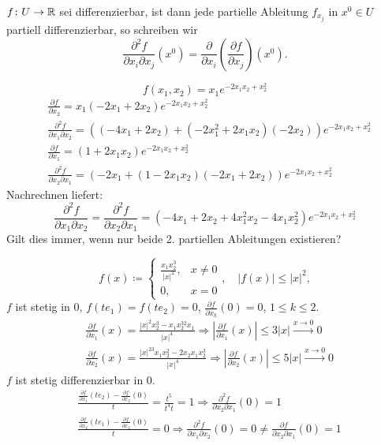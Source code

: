 \newpage
\begin{definition}
	$ f\colon U\rightarrow\mathbb{R} $ sei differenzierbar, ist dann jede partielle Ableitung $ f_{x_j} $ in $ x^0\in U $ partiell differenzierbar, so schreiben wir
	\[ \frac{\partial^2 f}{\partial x_i\partial x_j}(x^0)=\frac{\partial}{\partial x_i}\left(\frac{\partial f}{\partial x_j}\right)(x^0). \]
\end{definition}
\begin{beispiel*}
	\[ f(x_1,x_2)=x_1e^{-2x_1x_2+x_2^2} \]
	\begin{align*}
	&\frac{\partial f}{\partial x_2}=x_1(-2x_1+2x_2)e^{-2x_1x_2+x_2^2}\\
	&\frac{\partial^2 f}{\partial x_1\partial x_2}=((-4x_1+2x_2)+(-2x_1^2+2x_1x_2)(-2x_2))e^{-2x_1x_2+x_2^2}\\
	&\frac{\partial f}{\partial x_1}=(1+2x_1x_2)e^{-2x_1x_2+x_2^2}\\
	&\frac{\partial^2 f}{\partial x_2\partial x_1}=(-2x_1+(1-2x_1x_2)(-2x_1+2x_2))e^{-2x_1x_2+x_2^2}
	\end{align*}
	Nachrechnen liefert:
	\[ \frac{\partial^2 f}{\partial x_1\partial x_2}=\frac{\partial^2 f}{\partial x_2\partial x_1}=(-4x_1+2x_2+4x_1^2x_2-4x_1x_2^2)e^{-2x_1x_2+x_2^2} \]
	Gilt dies immer, wenn nur beide 2. partiellen Ableitungen existieren?
	\begin{beispiel*}
		\[ f(x)\coloneqq \begin{cases}
		\frac{x_1x_2^3}{|x|^2},&x\neq 0\\0,&x=0
		\end{cases},\quad |f(x)|\leq|x|^2, \]
		$ f $ ist stetig in $ 0 $, $ f(te_1)=f(te_2)=0 $, $ \frac{\partial f}{\partial x_k}(0)=0 $, $ 1\leq k\leq 2 $.
		\begin{align*}
		&\frac{\partial f}{\partial x_1}(x)=\frac{|x|^2x_2^3-x_1x_2^32x_1}{|x|^4}\Rightarrow\left|\frac{\partial f}{\partial x_1}(x)\right|\leq 3|x|\xrightarrow{x\to 0}0\\
		&\frac{\partial f}{\partial x_2}(x)=\frac{|x|^23x_1x_2^2-2x_2x_1x_2^3}{|x|^4}\Rightarrow\left|\frac{\partial f}{\partial x_2}(x)\right|\leq 5|x|\xrightarrow{x\to 0}0
		\end{align*}
		$ f $ ist stetig differenzierbar in $ 0 $.
		\begin{align*}
		&\frac{\frac{\partial f}{\partial x_1}(te_2)-\frac{\partial f}{\partial x_2}(0)}{t}=\frac{t^5}{t^4t}=1\Rightarrow\frac{\partial^2 f}{\partial x_2\partial x_1}(0)=1\\
		&\frac{\frac{\partial f}{\partial x_2}(te_1)-\frac{\partial f}{\partial x_2}(0)}{t}=0\Rightarrow\frac{\partial^2 f}{\partial x_1\partial x_2}(0)=0\neq\frac{\partial f}{\partial x_2\partial x_1}(0)=1
		\end{align*}
	\end{beispiel*}
\end{beispiel*}
